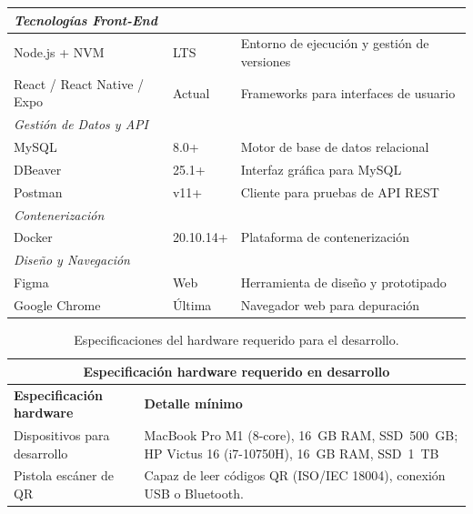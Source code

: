 \begin{longtable}{|p{}|p{}|p{}|}
\multicolumn{3}{|l|}{\textit{Tecnologías Front-End}} \\ \hline
Node.js + NVM & LTS & Entorno de ejecución y gestión de versiones \\
React / React Native / Expo & Actual & Frameworks para interfaces de usuario \\ \hline

\multicolumn{3}{|l|}{\textit{Gestión de Datos y API}} \\ \hline
MySQL & 8.0+ & Motor de base de datos relacional \\
DBeaver & 25.1+ & Interfaz gráfica para MySQL \\
Postman & v11+ & Cliente para pruebas de API REST \\ \hline

\multicolumn{3}{|l|}{\textit{Contenerización}} \\ \hline
Docker & 20.10.14+ & Plataforma de contenerización \\ \hline

\multicolumn{3}{|l|}{\textit{Diseño y Navegación}} \\ \hline
Figma & Web & Herramienta de diseño y prototipado \\
Google Chrome & Última & Navegador web para depuración \\ \hline

\end{longtable}


\begin{table}[H]

    \centering
    
    \caption{Especificaciones del hardware requerido para el desarrollo.}
    \label{tab:hardware_desarrollo}
    
    \begin{tabular}{|p{}|p{}|}
    
    \hline
    \multicolumn{2}{|c|}{\textbf{Especificación hardware requerido en desarrollo}}\\
    \hline
    \textbf{Especificación hardware} & \textbf{Detalle mínimo} \\
    \hline
    
    Dispositivos para desarrollo & MacBook Pro M1 (8-core), 16~GB RAM, SSD~500~GB; HP Victus 16 (i7-10750H), 16~GB RAM, SSD~1~TB \\
    \hline
    Pistola escáner de QR & Capaz de leer códigos QR (ISO/IEC 18004), conexión USB o Bluetooth. \\
    \hline
    
    \end{tabular}
\end{table}

